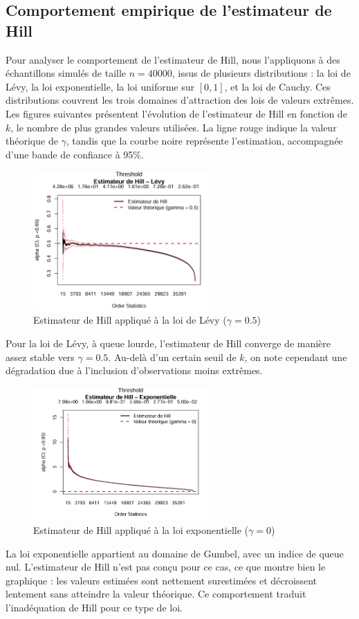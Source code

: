 \documentclass{article}
\theoremstyle{plain}
\theoremstyle{definition}
\theoremstyle{plain}
\begin{document}
\subsection{Comportement empirique de l’estimateur de Hill}
Pour analyser le comportement de l’estimateur de Hill, nous l’appliquons à des échantillons simulés de taille $n = 40000$, issus de plusieurs distributions : la loi de Lévy, la loi exponentielle, la loi uniforme sur \([0,1]\), et la loi de Cauchy. Ces distributions couvrent les trois domaines d’attraction des lois de valeurs extrêmes.
Les figures suivantes présentent l’évolution de l’estimateur de Hill en fonction de $k$, le nombre de plus grandes valeurs utilisées. La ligne rouge indique la valeur théorique de $\gamma$, tandis que la courbe noire représente l’estimation, accompagnée d’une bande de confiance à 95\%.
\begin{figure}[H]
    \centering
    \includegraphics[width=0.6\textwidth]{./image_hill_pickands/levy_hill.png}
    \caption{Estimateur de Hill appliqué à la loi de Lévy ($\gamma = 0.5$)}
\end{figure}
Pour la loi de Lévy, à queue lourde, l’estimateur de Hill converge de manière assez stable vers \(\gamma = 0.5\). Au-delà d’un certain seuil de \(k\), on note cependant une dégradation due à l’inclusion d’observations moins extrêmes.

\begin{figure}[H]
    \centering
    \includegraphics[width=0.6\textwidth]{./image_hill_pickands/exponentielle_hill.png}
    \caption{Estimateur de Hill appliqué à la loi exponentielle ($\gamma = 0$)}
\end{figure}
La loi exponentielle appartient au domaine de Gumbel, avec un indice de queue nul. L’estimateur de Hill n’est pas conçu pour ce cas, ce que montre bien le graphique : les valeurs estimées sont nettement surestimées et décroissent lentement sans atteindre la valeur théorique. Ce comportement traduit l’inadéquation de Hill pour ce type de loi.
\end{document}

